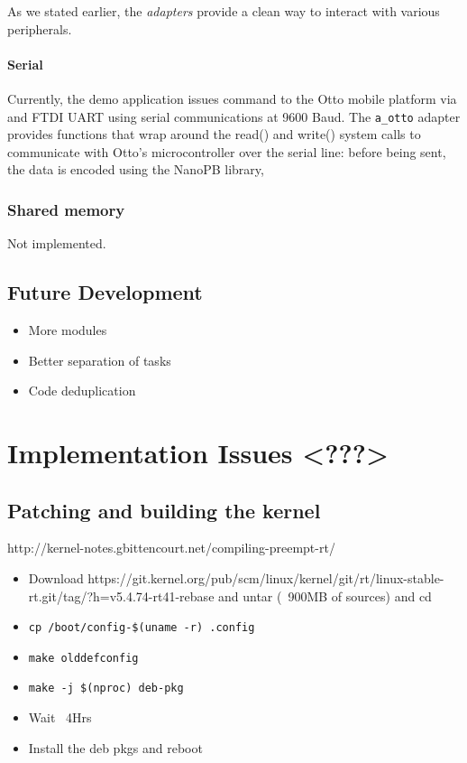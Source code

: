 \documentclass[a4paper,12pt]{report}
\begin{document}
As we stated earlier, the \textit{adapters} provide a clean way to interact with various peripherals.

\subsubsection{Serial}

Currently, the demo application issues command to the Otto mobile platform via and FTDI UART using serial communications at 9600 Baud. The \texttt{a\_otto} adapter provides functions that wrap around the read() and write() system calls to communicate with Otto's microcontroller over the serial line: before being sent, the data is encoded using the NanoPB library,  

\subsection{Shared memory}

Not implemented.

\section{Future Development}

\begin{itemize}
    \item More modules
    \item Better separation of tasks
    \item Code deduplication
\end{itemize}

\newpage
\chapter{Implementation Issues <???>}
\section{Patching and building the kernel}

http://kernel-notes.gbittencourt.net/compiling-preempt-rt/

\begin{itemize}
    \item Download https://git.kernel.org/pub/scm/linux/kernel/git/rt/linux-stable-rt.git/tag/?h=v5.4.74-rt41-rebase and untar (~900MB of sources) and cd
    \item \texttt{cp /boot/config-\$(uname -r) .config}
    \item \texttt{make olddefconfig}
    \item \texttt{make -j \$(nproc) deb-pkg}
    \item Wait ~4Hrs
    \item Install the deb pkgs and reboot
\end{itemize}
\end{document}
